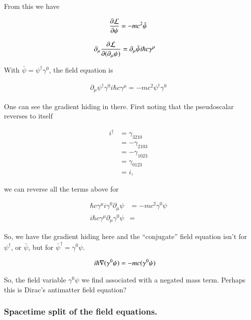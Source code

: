 \documentclass{article}
\begin{document}
From this we have

\begin{align*}
\frac{\partial {\mathcal{L}}}{\partial {\psi}} = -m c^2 \bar\psi
\end{align*}

\begin{align*}
\partial_\mu \frac{\partial {\mathcal{L}}}{\partial {(\partial_\mu \psi)}} 
&= \partial_\mu \bar\psi i \hbar c \gamma^\mu
\end{align*}

With $\bar\psi = \psi^\dagger \gamma^0$, the field equation is

\begin{align*}
\partial_\mu \psi^\dagger \gamma^0 i \hbar c \gamma^\mu = -m c^2 \psi^\dagger \gamma^0
\end{align*}

One can see the gradient hiding in there.  First noting that the pseudoscalar reverses to itself

\begin{align*}
i^\dagger 
&= \gamma_{3210} \\
&= -\gamma_{2103} \\
&= -\gamma_{1023} \\
&= \gamma_{0123} \\
&= i,
\end{align*}

we can reverse all the terms above for

\begin{align*}
\hbar c \gamma^\mu i \gamma^0 \partial_\mu \psi &= -m c^2 \gamma^0 \psi \\
i \hbar c \gamma^\mu \partial_\mu \gamma^0 \psi &=
\end{align*}

So, we have the gradient hiding here and the ``conjugate'' field equation isn't for $\psi^\dagger$, or $\bar \psi$, but for ${\bar\psi}^\dagger = \gamma^0 \psi$.  

\begin{align}\label{eqn:antimatter}
i \hbar \nabla (\gamma^0 \psi) &= -m c (\gamma^0 \psi)
\end{align}

So, the field variable $\gamma^0 \psi$ we find associated with a negated mass term.  Perhaps this is Dirac's antimatter field equation?

\subsubsection{ Spacetime split of the field equations. }
\end{document}
